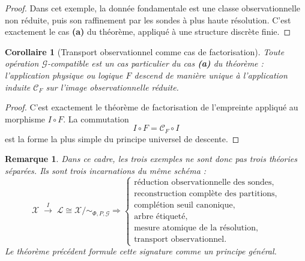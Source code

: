\documentclass[11pt,a4paper,openany]{book}
\newtheorem{corollary}[definition]{Corollaire}
\newtheorem{remark}[definition]{Remarque}
\begin{document}
\begin{proof}
Dans cet exemple, la donnée fondamentale est une classe observationnelle non réduite, puis son raffinement par les sondes à plus haute résolution. C'est exactement le cas \textbf{(a)} du théorème, appliqué à une structure discrète finie.
\end{proof}



\begin{corollary}[Transport observationnel comme cas de factorisation]
Toute opération \(\mathcal G\)-compatible est un cas particulier du cas \textbf{(a)} du théorème : l'application physique ou logique \(F\) descend de manière unique à l'application induite \(\mathcal C_F\) sur l'image observationnelle réduite.
\end{corollary}

\begin{proof}
C'est exactement le théorème de factorisation de l'empreinte appliqué au morphisme \(I\circ F\). La commutation
\[
I\circ F=\mathcal C_F\circ I
\]
est la forme la plus simple du principe universel de descente.
\end{proof}

\begin{remark}
Dans ce cadre, les trois exemples ne sont donc pas trois théories séparées. Ils sont trois incarnations du même schéma :
\[
\mathcal X
\;\xrightarrow{\,I\,}\;
\mathcal L
\cong
\mathcal X/{\sim_{\Phi,P,\mathcal G}}
\Longrightarrow
\begin{cases}
\text{réduction observationnelle des sondes},\\
\text{reconstruction complète des partitions},\\
\text{complétion seuil canonique},\\
\text{arbre étiqueté},\\
\text{mesure atomique de la résolution},\\
\text{transport observationnel}.
\end{cases}
\]
Le théorème précédent formule cette signature comme un principe général.
\end{remark}


%







%
\end{document}
